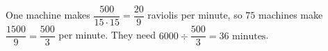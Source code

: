 One machine makes $\dfrac{500}{15\cdot15}=\dfrac{20}{9}$ raviolis per minute, so $75$ machines make $\dfrac{1500}{9}=\dfrac{500}{3}$ per minute. They need $6000\div\dfrac{500}{3}=\boxed{36\text{ minutes}}$.
